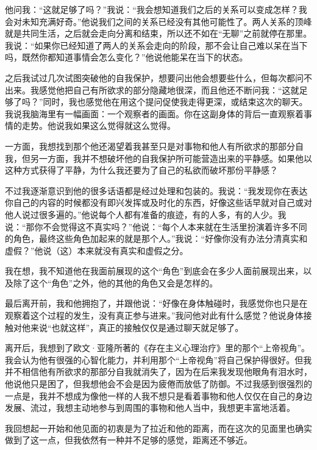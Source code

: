 他问我：“这就足够了吗？”我说：“我会想知道我们之后的关系可以变成怎样？我会对未知充满好奇。”他说我们之间的关系已经没有其他可能性了。两人关系的顶峰就是共同生活，之后就会走向分离和结束，所以还不如在“无聊”之前就停在那里。我说：“如果你已经知道了两人的关系会走向的阶段，那不会让自己难以呆在当下吗，既然你都知道事情会怎么变化？”他说他能呆在当下的状态。


之后我试过几次试图突破他的自我保护，想要问出他会想要些什么，但每次都问不出来。我感觉他把自己有所欲求的部分隐藏地很深，而且他还不断问我：“这就足够了吗？”同时，我也感觉他在用这个提问促使我走得更深，或结束这次的聊天。我说我脑海里有一幅画面：一个观察者的画面。你在这副身体的背后一直观察着事情的走势。他说我如果这么觉得就这么觉得。

一方面，我想找到那个他还渴望着我甚至只是对事物和他人有所欲求的那部分自我，但另一方面，我并不想破坏他的自我保护所可能营造出来的平静感。如果他以这种方式获得了平静，为什么我还要为了自己的私欲而破坏那份平静感？


不过我逐渐意识到他的很多话语都是经过处理和包装的。我说：“我发现你在表达你自己的内容的时候都没有即兴发挥或及时化的东西，好像这些话早就对自己或对他人说过很多遍的。”他说每个人都有准备的痕迹，有的人多，有的人少。我说：“那你不会觉得这不真实吗？”他说：“每个人本来就在生活里扮演着许多不同的角色，最终这些角色加起来的就是那个人。”我说：“好像你没有办法分清真实和虚假？”他说（这）本来就没有真实和虚假之分。

我在想，我不知道他在我面前展现的这个“角色”到底会在多少人面前展现出来，以及除了这个“角色”之外，他的其他的角色又会是怎样的。


最后离开前，我和他拥抱了，并跟他说：“好像在身体触碰时，我感觉你也只是在观察着这个过程的发生，没有真正参与进来。”我问他对此有什么感觉？他说身体接触对他来说“也就这样”，真正的接触仅仅是通过聊天就足够了。


离开后，我想到了欧文·亚隆所著的《存在主义心理治疗》里的那个“上帝视角”。我会认为他有很强的心智化能力，并利用那个“上帝视角”将自己保护得很好。但我并不相信他有所欲求的那部分自我就消失了，因为在后来我发现他眼角有泪水时，他说他只是困了，但我想他会不会是因为疲倦而放低了防御。不过我感到很强烈的一点是，我并不想成为像他一样的人\pozhehao{}我不想只是看着事物和他人仅仅在自己的身边发展、流过，我想主动地参与到周围的事物和他人当中，我想更丰富地活着。

我回想起一开始和他见面的初衷是为了拉近和他的距离，而在这次的见面里也确实做到了这一点，但我依然有一种并不足够的感觉，距离还不够近。
